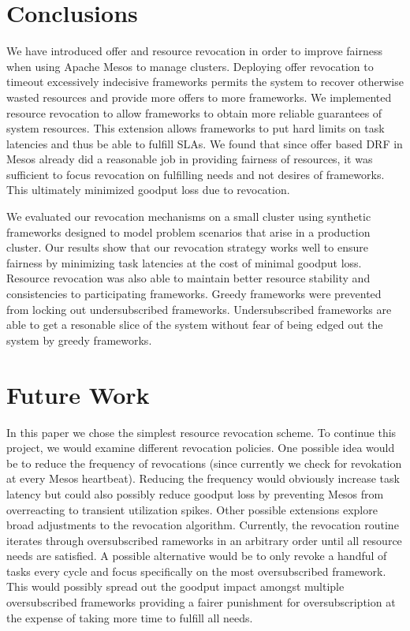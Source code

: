 \section{Conclusions}
We have introduced offer and resource revocation in order to improve fairness when using Apache Mesos
to manage clusters. Deploying offer revocation to timeout excessively indecisive frameworks permits the
system to recover otherwise wasted resources and provide more offers to more frameworks. We implemented
resource revocation to allow frameworks to obtain more reliable guarantees of system resources. This
extension allows frameworks to put hard limits on task latencies and thus be able to fulfill SLAs. We
found that since offer based DRF in Mesos already did a reasonable job in providing fairness of
resources, it was sufficient to focus revocation on fulfilling needs and not desires of frameworks. This
ultimately minimized goodput loss due to revocation.

We evaluated our revocation mechanisms on a small cluster using synthetic frameworks designed to model
problem scenarios that arise in a production cluster. Our results show that our revocation strategy
works well to ensure fairness by minimizing task latencies at the cost of minimal goodput loss. Resource
revocation was also able to maintain better resource stability and consistencies to participating
frameworks. Greedy frameworks were prevented from locking out undersubscribed frameworks.
Undersubscribed frameworks are able to get a resonable slice of the system without fear of being edged
out the system by greedy frameworks.

\section{Future Work}
In this paper we chose the simplest resource revocation scheme. To continue this project, we would
examine different revocation policies. One possible idea would be to reduce the frequency of revocations
(since currently we check for revokation at every Mesos heartbeat). Reducing the frequency would
obviously increase task latency but could also possibly reduce goodput loss by preventing Mesos from
overreacting to transient utilization spikes. Other possible extensions explore broad adjustments to the
revocation algorithm. Currently, the revocation routine iterates through oversubscribed rameworks in an
arbitrary order until all resource needs are satisfied. A possible alternative would be to only revoke a
handful of tasks every cycle and focus specifically on the most oversubscribed framework. This would
possibly spread out the goodput impact amongst multiple oversubscribed frameworks providing a fairer
punishment for oversubscription at the expense of taking more time to fulfill all needs.

